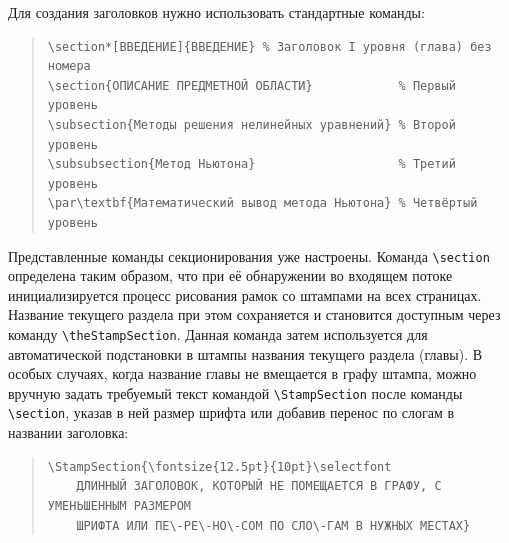 \documentclass[14pt]{extarticle}
\begin{document}
Для создания заголовков нужно использовать стандартные команды:
\begin{quote}
\small
\begin{verbatim}
\section*[ВВЕДЕНИЕ]{ВВЕДЕНИЕ} % Заголовок I уровня (глава) без номера
\section{ОПИСАНИЕ ПРЕДМЕТНОЙ ОБЛАСТИ}            % Первый уровень
\subsection{Методы решения нелинейных уравнений} % Второй уровень
\subsubsection{Метод Ньютона}                    % Третий уровень
\par\textbf{Математический вывод метода Ньютона} % Четвёртый уровень
\end{verbatim}
\end{quote}

Представленные команды секционирования уже настроены. Команда \linebreak \verb|\section| определена таким образом, что при её обнаружении во входящем потоке инициализируется процесс рисования рамок со штампами на всех страницах. Название текущего раздела при этом сохраняется и становится доступным через команду \texttt{\textbackslash theStampSection}. Данная команда затем используется для автоматической подстановки в штампы названия текущего раздела (главы). В особых случаях, когда название главы не вмещается в графу штампа, можно вручную задать требуемый текст  командой \texttt{\textbackslash StampSection} после команды \verb|\section|, указав в ней размер шрифта или добавив перенос по слогам в названии заголовка:

\begin{quote}
\small
\begin{verbatim}
\StampSection{\fontsize{12.5pt}{10pt}\selectfont
	ДЛИННЫЙ ЗАГОЛОВОК, КОТОРЫЙ НЕ ПОМЕЩАЕТСЯ В ГРАФУ, С УМЕНЬШЕННЫМ РАЗМЕРОМ
	ШРИФТА ИЛИ ПЕ\-РЕ\-НО\-СОМ ПО СЛО\-ГАМ В НУЖНЫХ МЕСТАХ}
\end{verbatim}
\end{quote}
\end{document}
